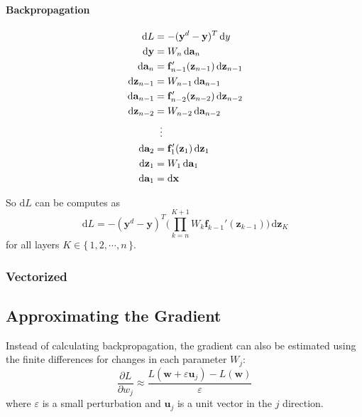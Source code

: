 \documentclass[a4paper, 11pt, accentcolor = tud3b]{tudreport}
\newcommand{\dif}[1]{\ensuremath{\,\mathrm{d}#1}}
\renewcommand{\vec}[1]{\mathbf{#1}}
\begin{document}
				\paragraph{Backpropagation} %
					\begin{align}
						\dif{L} &= -(\vec{y}^d - \vec{y})^T \dif{y} \\
						\dif{\vec{y}} &= W_n \dif{\vec{a}_n} \\
						\dif{\vec{a}_n} &= \vec{f}_{n - 1}' (\vec{z}_{n - 1}) \dif{\vec{z}_{n - 1}} \\
						\dif{\vec{z}_{n - 1}} &= W_{n - 1} \dif{\vec{a}_{n - 1}} \\
						\dif{\vec{a}_{n - 1}} &= \vec{f}_{n - 2}' (\vec{z}_{n - 2}) \dif{\vec{z}_{n - 2}} \\
						\dif{\vec{z}_{n - 2}} &= W_{n - 2} \dif{\vec{a}_{n - 2}} \\
						&\hspace{0.2cm}\vdots \\
						\dif{\vec{a}_2} &= \vec{f}_1' (\vec{z}_1) \dif{\vec{z}_1} \\
						\dif{\vec{z}_1} &= W_1 \dif{\vec{a}_1} \\
						\dif{\vec{a}_1} &= \textrm{d}\vec{x}
					\end{align}
					
					So \( \textrm{d}L \) can be computes as
					\begin{equation}
						\dif{L} = -(\vec{y}^d - \vec{y})^T \Bigg( \prod_{k = n}^{K + 1} W_k \vec{f}_{k - 1}' (\vec{z}_{k - 1}) \Bigg) \dif{\vec{z}_K}
					\end{equation}
					for all layers \( K \in \{\, 1, 2, \cdots, n \,\} \).

				\subsubsection{Vectorized} %

			\subsection{Approximating the Gradient}
				Instead of calculating backpropagation, the gradient can also be estimated using the finite differences for changes in each parameter \( W_j \):
				\begin{equation}
					\frac{\partial L}{\partial w_j} \approx \frac{L(\vec{w} + \varepsilon \vec{u}_j) - L(\vec{w})}{\varepsilon}
				\end{equation}
				where \(\varepsilon\) is a small perturbation and \(\vec{u}_j\) is a unit vector in the \(j\) direction.
				
\end{document}
